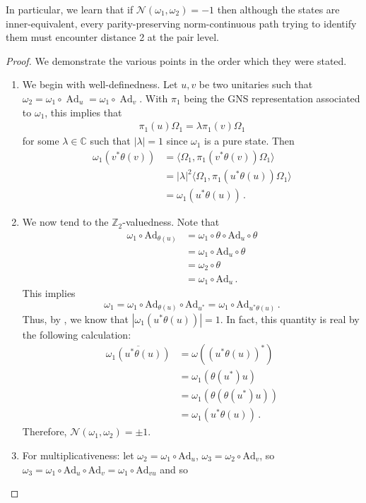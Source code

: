 \documentclass[a4paper,10pt]{article}
\numberwithin{equation}{section}
\theoremstyle{plain}
\theoremstyle{plain}
\theoremstyle{plain}
\theoremstyle{plain}
\theoremstyle{plain}
\theoremstyle{remark}
\theoremstyle{definition}
\newcommand{\ZZ}{\mathbb{Z}}
\newcommand{\CC}{\mathbb{C}}
\newcommand{\calN}{\mathcal{N}}
\newcommand{\Ad}[1]{\operatorname{Ad}_{#1}}
\newcommand{\eq}[1]{\begin{align*}#1\end{align*}}
\begin{document}
In particular, we learn that if $\calN(\omega_1,\omega_2)=-1$ then although the states are inner-equivalent, every parity-preserving norm-continuous path trying to identify them must encounter distance 2 at the pair level.
\begin{proof}
We demonstrate the various points in the order which they were stated.
\begin{enumerate}
    \item We begin with well-definedness. Let $u,v$ be two unitaries such that $\omega_2 = \omega_1\circ\Ad{u}=\omega_1\circ\Ad{v}$.  With $\pi_1$ being the GNS representation associated to $\omega_1$, this implies that 
    \eq{\pi_1(u)\Omega_1 = \lambda \pi_1(v)\Omega_1 } for some $\lambda\in\CC$ such that $|\lambda| =1$ since $\omega_1$ is a pure state. Then
    \eq{
        \omega_1(v^* \theta(v)) &= \langle \Omega_1, \pi_1 \left(v^* \theta(v) \right)\Omega_1\rangle  \\ 
        &= |\lambda|^2\langle \Omega_1, \pi_1 \left(u^* \theta(u) \right)\Omega_1\rangle \\
        &= \omega_1(u^* \theta(u))\,.
    }
    \item We now tend to the $\ZZ_2$-valuedness. Note that\eq{
        \omega_1 \circ \text{Ad}_{\theta(u)} &= \omega_1 \circ \theta \circ \text{Ad}_u \circ \theta \\ 
        &= \omega_1 \circ\text{Ad}_u \circ \theta  \\ 
        &= \omega_2 \circ \theta \\ 
        &= \omega_1 \circ\text{Ad}_u\,.
    }
    This implies \[\omega_1 = \omega_1 \circ \text{Ad}_{\theta(u)} \circ\text{Ad}_{u^*}  = \omega_1 \circ \text{Ad}_{u^*\theta(u)}\,.\]
    Thus, by \cite[Lemma 2.7]{BachmannShapiroTauber2026}, we know that 
    $|\omega_1(u^* \theta(u))| = 1$. 
    In fact, this quantity is real by the following calculation: 
    \begin{align*}
        \overline{\omega_1( u^* \theta(u))} &= \omega((u^* \theta(u))^*) \\ 
        &= \omega_1(\theta(u^*)u) \\ 
        &= \omega_1(\theta (\theta(u^*)u)) \\
        &= \omega_1(u^*\theta(u))\,.
    \end{align*}
    Therefore, $\calN(\omega_1, \omega_2) = \pm 1$.
    \item For multiplicativeness: let $\omega_2 = \omega_1 \circ \text{Ad}_u$, $\omega_3 = \omega_2 \circ \text{Ad}_v$, so $\omega_3 = \omega_1 \circ \text{Ad}_u \circ\text{Ad}_v = \omega_1 \circ \text{Ad}_{vu} $ and so

\end{enumerate}
\end{proof}
\end{document}
